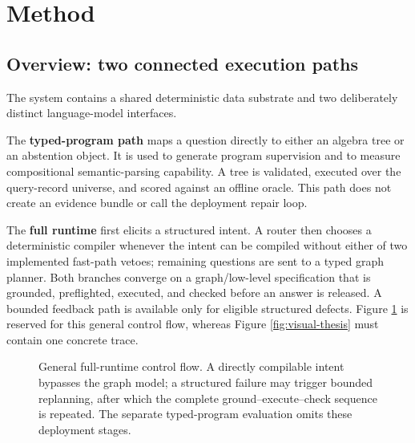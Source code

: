 \section{Method}
\label{sec:method}

\subsection{Overview: two connected execution paths}
\label{sec:overview}

The system contains a shared deterministic data substrate and two deliberately distinct
language-model interfaces.

The \textbf{typed-program path} maps a question directly to either an algebra tree or an
abstention object.  It is used to generate program supervision and to measure compositional
semantic-parsing capability.  A tree is validated, executed over the query-record universe, and
scored against an offline oracle.  This path does not create an evidence bundle or call the
deployment repair loop.

The \textbf{full runtime} first elicits a structured intent.  A router then chooses a
deterministic compiler whenever the intent can be compiled without either of two implemented
fast-path vetoes; remaining questions are sent to a typed graph planner.  Both branches converge
on a graph/low-level specification that is grounded, preflighted, executed, and checked before
an answer is released.  A bounded feedback path is available only for eligible structured
defects.  Figure \ref{fig:method-overview} is reserved for this general control flow, whereas
Figure \ref{fig:visual-thesis} must contain one concrete trace.

\begin{figure}[t]
  \centering
  \caption{General full-runtime control flow.  A directly compilable intent bypasses the graph
  model; a structured failure may trigger bounded replanning, after which the complete
  ground--execute--check sequence is repeated.  The separate typed-program evaluation omits
  these deployment stages.}
  \label{fig:method-overview}
\end{figure}

